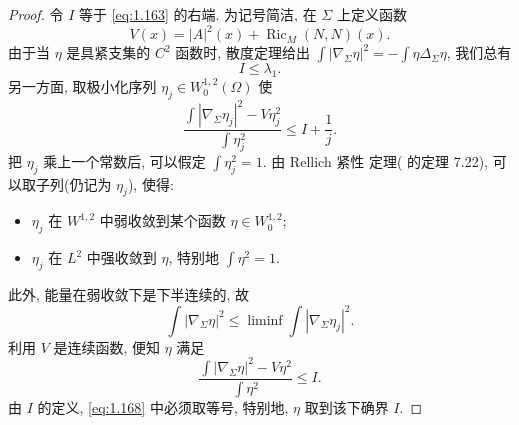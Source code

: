 \begin{proof}
令 $I$ 等于 \eqref{eq:1.163} 的右端. 为记号简洁, 在 $\Sigma$ 上定义函数
\begin{equation}
V(x)=|A|^{2}(x)+\operatorname{Ric}_M(N,N)(x).
\label{eq:1.165}
\end{equation}
由于当 $\eta$ 是具紧支集的 $C^{2}$ 函数时, 散度定理给出
$\int|\nabla_{\Sigma}\eta|^{2}=-\int\eta\Delta_{\Sigma}\eta$, 我们总有
\begin{equation}
I\leq\lambda_1.
\label{eq:1.166}
\end{equation}
另一方面, 取极小化序列 $\eta_j\in W_0^{1,2}(\Omega)$ 使
\begin{equation}
\frac{\int|\nabla_{\Sigma}\eta_j|^{2}-V\eta_j^{2}}{\int\eta_j^{2}}
 \leq I+\frac1j.
\label{eq:1.167}
\end{equation}
把 $\eta_j$ 乘上一个常数后, 可以假定 $\int\eta_j^{2}=1$. 由 Rellich 紧性
定理(\cite{GiTr} 的定理 7.22), 可以取子列(仍记为 $\eta_j$), 使得:
\begin{itemize}
  \item $\eta_j$ 在 $W^{1,2}$ 中弱收敛到某个函数 $\eta\in W_0^{1,2}$;
  \item $\eta_j$ 在 $L^{2}$ 中强收敛到 $\eta$, 特别地 $\int\eta^{2}=1$.
\end{itemize}
此外, 能量在弱收敛下是下半连续的, 故
\[
\int|\nabla_{\Sigma}\eta|^{2}
 \leq\liminf\int|\nabla_{\Sigma}\eta_j|^{2}.
\]
利用 $V$ 是连续函数, 便知 $\eta$ 满足
\begin{equation}
\frac{\int|\nabla_{\Sigma}\eta|^{2}-V\eta^{2}}{\int\eta^{2}}\leq I.
\label{eq:1.168}
\end{equation}
由 $I$ 的定义, \eqref{eq:1.168} 中必须取等号, 特别地, $\eta$ 取到该下确界 $I$.


\end{proof}
